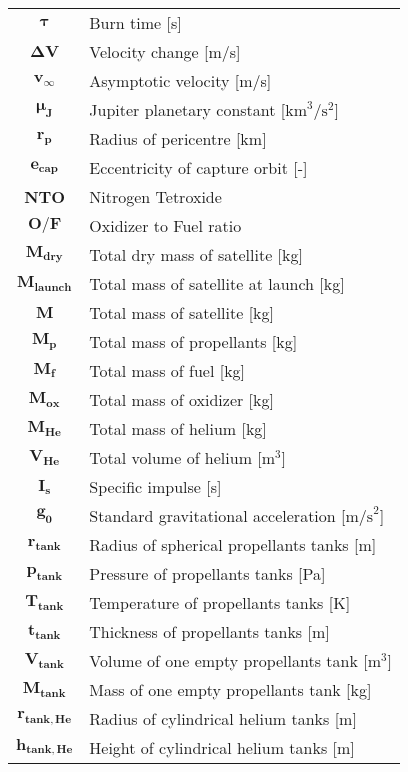 \begin{multicols}{2}
{\begin{xltabular}{\linewidth}{c>{\raggedright\arraybackslash}X}
		$\boldsymbol{\tau}$ & Burn time [s] \\
		$\boldsymbol{\Delta V}$ & Velocity change [m/s] \\
		$\boldsymbol{v_\infty}$ & Asymptotic velocity [m/s] \\
		$\boldsymbol{\mu_J}$ & Jupiter planetary constant [$\textrm{km}^3/\textrm{s}^2$] \\
		$\boldsymbol{r_p}$ & Radius of pericentre [km] \\
		$\boldsymbol{e_{cap}}$ & Eccentricity of capture orbit [-] \\
		\textbf{NTO} & Nitrogen Tetroxide \\
		$\boldsymbol{O/F}$ & Oxidizer to Fuel ratio \\
		$\boldsymbol{M_{dry}}$ & Total dry mass of satellite [kg] \\
		$\boldsymbol{M_{launch}}$ & Total mass of satellite at launch [kg] \\
		$\boldsymbol{M}$ & Total mass of satellite [kg] \\
		$\boldsymbol{M_p}$ & Total mass of propellants [kg] \\
		$\boldsymbol{M_f}$ & Total mass of fuel [kg] \\
		$\boldsymbol{M_{ox}}$ & Total mass of oxidizer [kg] \\
		$\boldsymbol{M_{He}}$ & Total mass of helium [kg] \\
		$\boldsymbol{V_{He}}$ & Total volume of helium [$\textrm{m}^3$] \\
		$\boldsymbol{I_s}$ & Specific impulse [s] \\
		$\boldsymbol{g_0}$ & Standard gravitational acceleration [$\textrm{m/s}^2$] \\
		$\boldsymbol{r_{tank}}$ & Radius of spherical propellants tanks [m] \\
		$\boldsymbol{p_{tank}}$ & Pressure of propellants tanks [Pa] \\
		$\boldsymbol{T_{tank}}$ & Temperature of propellants tanks [K] \\
		$\boldsymbol{t_{tank}}$ & Thickness of propellants tanks [m] \\
		$\boldsymbol{V_{tank}}$ & Volume of one empty propellants tank [$\textrm{m}^3$] \\
		$\boldsymbol{M_{tank}}$ & Mass of one empty propellants tank [kg] \\
		$\boldsymbol{r_{tank,He}}$ & Radius of cylindrical helium tanks [m] \\
		$\boldsymbol{h_{tank,He}}$ & Height of cylindrical helium tanks [m] \\

\end{xltabular}}
\end{multicols}

